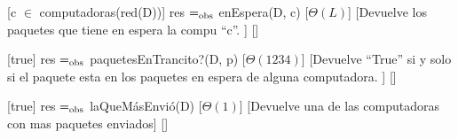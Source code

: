 \begin{Interfaz}
  [c $\in$ computadoras(red(D))]%
  {res $=_{\mathrm{obs}}$ enEspera(D, c)}%
  [$\Theta(L)$]%
  [Devuelve los paquetes que tiene en espera la compu ``c''. ]%
  []%

  [true]%
  {res $=_{\mathrm{obs}}$ paquetesEnTrancito?(D, p)}%
  [$\Theta(1234)$]%
  [Devuelve ``True'' si y solo si el paquete esta en los paquetes en espera de alguna computadora. ]%
  []%

  [true]%
  {res $=_{\mathrm{obs}}$ laQueM\'asEnvi\'o(D)}%
  [$\Theta(1)$]%
  [Devuelve una de las computadoras con mas paquetes enviados]%
  []%


\end{Interfaz}

